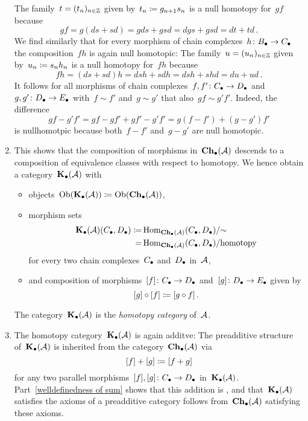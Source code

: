 \begin{remarkdefinition}
\begin{enumerate}
      The family~$t = (t_n)_{n \in \mathbb{Z}}$ given by~$t_n \coloneqq g_{n+1} s_n$ is a null homotopy for~$gf$ because
      \[
          gf
        = g(ds + sd)
        = gds + gsd
        = dgs + gsd
        = dt + td \,.
      \]
      We find similarly that for every morphism of chain complexes~$h \colon B_\bullet \to C_\bullet$ the composition~$fh$ is again null homotopic:
      The family~$u = (u_n)_{n \in \mathbb{Z}}$ given by~$u_n \coloneqq s_n h_n$ is a null homotopy for~$fh$ because
      \[
          fh
        = (ds + sd)h
        = dsh + sdh
        = dsh + shd
        = du + ud \,.
      \]
      It follows for all morphisms of chain complexes~$f, f' \colon C_\bullet \to D_\bullet$ and~$g, g' \colon D_\bullet \to E_\bullet$ with~$f \sim f'$ and~$g \sim g'$ that also~$gf \sim g'f'$.
      Indeed, the difference
      \[
          gf - g'f'
        = gf - gf' + gf' - g'f'
        = g(f - f') + (g - g')f'
      \]
      is nullhomotpic because both~$f-f'$ and~$g-g'$ are null homotopic.
    \item
      This shows that the composition of morphisms in~$\mathbf{Ch}_\bullet(\mathcal{A})$ descends to a composition of equivalence classes with respect to homotopy.
      We hence obtain a category~$\mathbf{K}_\bullet(\mathcal{A})$ with
      \begin{itemize}
        \item
          objects~$\operatorname{Ob}(\mathbf{K}_\bullet(\mathcal{A})) \coloneqq \operatorname{Ob}(\mathbf{Ch}_\bullet(\mathcal{A}))$,
        \item
          morphism sets
          \begin{align*}
                        \mathbf{K}_\bullet(\mathcal{A})(C_\bullet, D_\bullet)
            \coloneqq&{} \operatorname{Hom}_{\mathbf{Ch}_\bullet(\mathcal{A})}(C_\bullet,D_\bullet)/{\sim} \\
                   =&{} \operatorname{Hom}_{\mathbf{Ch}_\bullet(\mathcal{A})}(C_\bullet,D_\bullet)/\text{homotopy}
          \end{align*}
          for every two chain complexes~$C_\bullet$ and~$D_\bullet$ in~$\mathcal{A}$,
        \item
          and composition of morphisms~$[f] \colon C_\bullet \to D_\bullet$ and~$[g] \colon D_\bullet \to E_\bullet$ given by
          \[
                      [g] \circ [f]
            \coloneqq  [g \circ f] \,.
          \]
      \end{itemize}
      The category~$\mathbf{K}_\bullet(\mathcal{A})$ is the \emph{homotopy category} of~$\mathcal{A}$.
    \item
      The homotopy category~$\mathbf{K}_\bullet(\mathcal{A})$ is again additve:
      The preadditive structure of~$\mathbf{K}_\bullet(\mathcal{A})$ is inherited from the category~$\mathbf{Ch}_\bullet(\mathcal{A})$ via
      \[
                  [f] + [g]
        \coloneqq  [f + g]
      \]
      for any two parallel morphisms~$[f], [g] \colon C_\bullet \to D_\bullet$ in~$\mathbf{K}_\bullet(\mathcal{A})$.
      Part~\ref{welldefinedness of sum} shows that this addition is {\welldef}, and that~$\mathbf{K}_\bullet(\mathcal{A})$ satisfies the axioms of a preadditive category follows from~$\mathbf{Ch}_\bullet(\mathcal{A})$ satisfying these axioms.
      

\end{enumerate}
\end{remarkdefinition}
